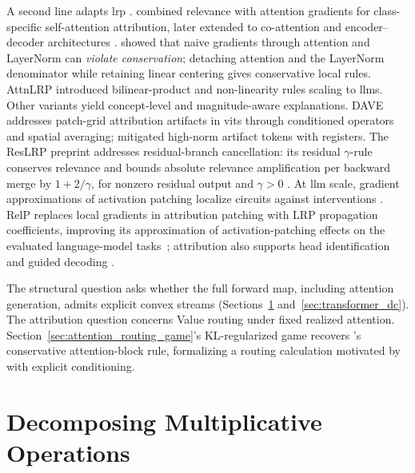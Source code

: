 A second line adapts \ac{lrp} \parencite{Bach2015}. \textcite{Chefer2021GenericAttention} combined relevance with attention gradients for class-specific self-attention attribution, later extended to co-attention and encoder--decoder architectures \parencite{Chefer2021ICCV}. \textcite{Ali2022AttnLRP} showed that naive gradients through attention and LayerNorm can \emph{violate conservation}; detaching attention and the LayerNorm denominator while retaining linear centering gives conservative local rules. AttnLRP \parencite{Achtibat2024AttnLRP} introduced bilinear-product and non-linearity rules scaling to \acp{llm}. Other variants yield concept-level \parencite{Achtibat2023CRP} and magnitude-aware \parencite{vukadin2024abslrp} explanations. DAVE \parencite{Wrobel2024} addresses patch-grid attribution artifacts in \acp{vit} \parencite{Dosovitskiy2021vit} through conditioned operators and spatial averaging; \textcite{darcet2024vision} mitigated high-norm artifact tokens with registers. The ResLRP preprint addresses residual-branch cancellation: its residual $\gamma$-rule conserves relevance and bounds absolute relevance amplification per backward merge by $1+2/\gamma$, for nonzero residual output and $\gamma>0$ \parencite{Berend2026ResLRP}. At \ac{llm} scale, gradient approximations of activation patching \parencite{Syed2024AttributionPatching,Kramar2024AtPStar} localize circuits against interventions \parencite{Hanna2024Faithfulness}. RelP replaces local gradients in attribution patching with LRP propagation coefficients, improving its approximation of activation-patching effects on the evaluated language-model tasks~\parencite{Jafari2025RelP}; attribution also supports head identification and guided decoding \parencite{Kahardipraja2025Atlas,Komorowski2026AGD}.

The structural question asks whether the full forward map, including attention generation, admits explicit convex streams (Sections~\ref{sec:multiplicative_splits} and~\ref{sec:transformer_dc}). The attribution question concerns Value routing under fixed realized attention. Section~\ref{sec:attention_routing_game}'s KL-regularized game recovers \textcite{Ali2022AttnLRP}'s conservative attention-block rule, formalizing a routing calculation motivated by \textcite{Abnar2020attention} with explicit conditioning.

\section{Decomposing Multiplicative Operations}\label{sec:multiplicative_splits}


